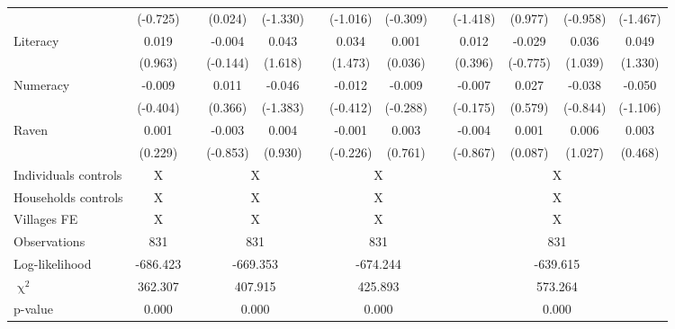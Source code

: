 \begin{table}[htbp]
{\begin{tabular}{lcccccccccccc}
      & (-0.725) &   & (0.024) & (-1.330) &   & (-1.016) & (-0.309) &   & (-1.418) & (0.977) & (-0.958) & (-1.467) \\
    Literacy & 0.019 &   & -0.004 & 0.043 &   & 0.034 & 0.001 &   & 0.012 & -0.029 & 0.036 & 0.049 \\
      & (0.963) &   & (-0.144) & (1.618) &   & (1.473) & (0.036) &   & (0.396) & (-0.775) & (1.039) & (1.330) \\
    Numeracy & -0.009 &   & 0.011 & -0.046 &   & -0.012 & -0.009 &   & -0.007 & 0.027 & -0.038 & -0.050 \\
      & (-0.404) &   & (0.366) & (-1.383) &   & (-0.412) & (-0.288) &   & (-0.175) & (0.579) & (-0.844) & (-1.106) \\
    Raven & 0.001 &   & -0.003 & 0.004 &   & -0.001 & 0.003 &   & -0.004 & 0.001 & 0.006 & 0.003 \\
      & (0.229) &   & (-0.853) & (0.930) &   & (-0.226) & (0.761) &   & (-0.867) & (0.087) & (1.027) & (0.468) \\
    \midrule
    Individuals controls & X     &       & \multicolumn{2}{c}{X} &       & \multicolumn{2}{c}{X} &       & \multicolumn{4}{c}{X} \\
    Households controls & X     &       & \multicolumn{2}{c}{X} &       & \multicolumn{2}{c}{X} &       & \multicolumn{4}{c}{X} \\
    Villages FE & X     &       & \multicolumn{2}{c}{X} &       & \multicolumn{2}{c}{X} &       & \multicolumn{4}{c}{X} \\
    \midrule
    Observations & 831   &       & \multicolumn{2}{c}{831} &       & \multicolumn{2}{c}{831} &       & \multicolumn{4}{c}{831} \\
    Log-likelihood & -686.423 &       & \multicolumn{2}{c}{-669.353} &       & \multicolumn{2}{c}{-674.244} &       & \multicolumn{4}{c}{-639.615} \\
    $\upchi^2$ & 362.307 &       & \multicolumn{2}{c}{407.915} &       & \multicolumn{2}{c}{425.893} &       & \multicolumn{4}{c}{573.264} \\
    p-value & 0.000 &       & \multicolumn{2}{c}{0.000} &       & \multicolumn{2}{c}{0.000} &       & \multicolumn{4}{c}{0.000} \\
    \bottomrule

    \end{tabular}%
    }
  \label{tab:ame_debtpath}%
\end{table}%

